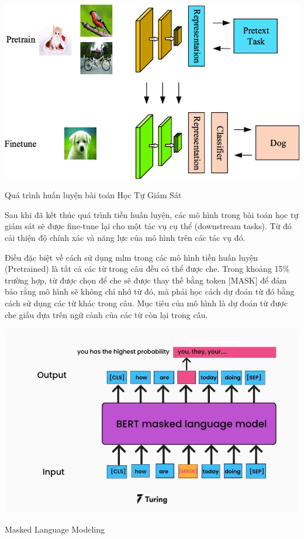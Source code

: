 \documentclass[a4paper, 12pt, openany]{book}
\begin{document}
\begin{minipage}{\linewidth}
    \captionsetup{type=figure}
    \centering
    \includegraphics[width=1\linewidth]{./assets/images/self-supervised.png}
    \caption{Quá trình huấn luyện bài toán Học Tự Giám Sát\cite{balestriero2023cookbook}}
\end{minipage}

\vspace{0.5cm}

Sau khi đã kết thúc quá trình tiền huấn luyện, các mô hình trong bài toán học tự giám sát sẽ được
fine-tune lại cho một tác vụ cụ thể (downstream tasks). Từ đó cải thiện độ chính xác và năng lực của mô hình
trên các tác vụ đó.

Điều đặc biệt về cách sử dụng \ac{mlm} trong các mô hình tiền huấn luyện (Pretrained) là tất cả các từ trong câu đều có
thể được che. Trong khoảng 15\% trường hợp, từ được chọn để che sẽ được thay thế bằng token
[MASK] để đảm bảo rằng mô hình sẽ không chỉ nhớ từ đó, mà phải học cách dự đoán từ
đó bằng cách sử dụng các từ khác trong câu. Mục tiêu của mô hình là dự đoán từ được che giấu dựa trên ngữ cảnh của các từ còn lại trong câu.

\begin{minipage}{\linewidth}
    \captionsetup{type=figure}
    \centering
    \includegraphics[width=\linewidth]{./assets/images/mllm.png}
    \caption{Masked Language Modeling\cite{mlm}}
\end{minipage}
\vspace{0.5cm}
\end{document}

